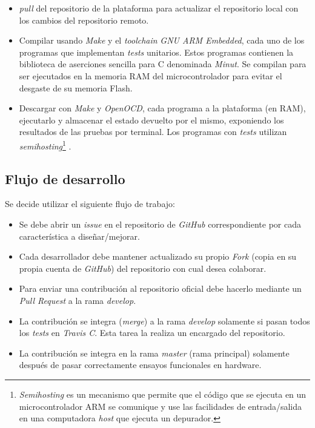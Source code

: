 \begin{itemize}
\item
\emph{pull} del repositorio de la plataforma para actualizar el repositorio local con los cambios del repositorio remoto.
\item
Compilar usando \emph{Make} y el \emph{toolchain} \emph{GNU ARM Embedded}, cada uno de los programas que implementan \emph{tests} unitarios. Estos programas contienen la biblioteca de aserciones sencilla para C denominada \emph{Minut}. Se compilan para ser ejecutados en la memoria RAM del microcontrolador para evitar el desgaste de su memoria Flash.
\item
Descargar con \emph{Make} y \emph{OpenOCD}, cada programa a la plataforma (en RAM), ejecutarlo y almacenar el estado devuelto por el mismo, exponiendo los resultados de las pruebas por terminal. Los programas con \emph{tests} utilizan \emph{semihosting}\footnote{\emph{Semihosting} es un mecanismo que permite que el código que se ejecuta en un microcontrolador ARM se comunique y use las facilidades de entrada/salida en una computadora \emph{host} que ejecuta un depurador.} \citep{semihosting}.
\end{itemize}

\subsection{Flujo de desarrollo}

Se decide utilizar el siguiente flujo de trabajo:

\begin{itemize}
\item
Se debe abrir un \emph{issue} en el repositorio de \emph{GitHub} correspondiente por cada característica a diseñar/mejorar.
\item
Cada desarrollador debe mantener actualizado su propio \emph{Fork} (copia en su propia cuenta de \emph{GitHub}) del repositorio con cual desea colaborar.
\item
Para enviar una contribución al repositorio oficial debe hacerlo mediante un \emph{Pull Request} a la rama \emph{develop}.
\item
La contribución se integra (\emph{merge}) a la rama \emph{develop} solamente si pasan todos los \emph{tests} en \emph{Travis C}. Esta tarea la realiza un encargado del repositorio.
\item
La contribución se integra en la rama \emph{master} (rama principal) solamente después de pasar correctamente ensayos funcionales en hardware.
\end{itemize}






